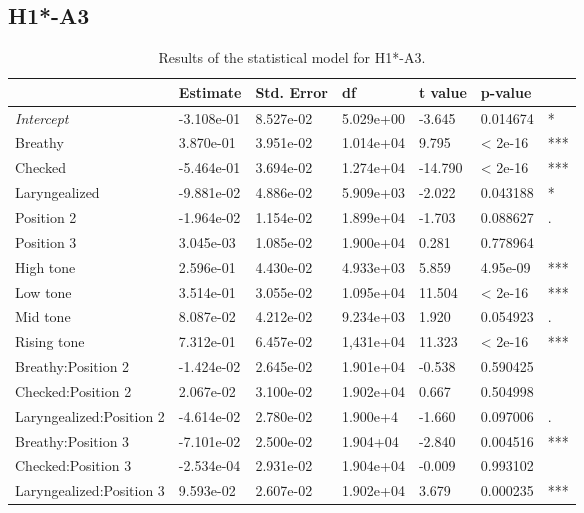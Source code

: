\documentclass[12pt, letterpaper]{article}
\providecommand{\lsptoprule}{\midrule\toprule}
\providecommand{\lspbottomrule}{\bottomrule\midrule}
\begin{document}
\subsection{H1*-A3} \label{sec:H1A3}

\begin{table}[!h]
  \centering
  \caption{Results of the statistical model for H1*-A3.}
  \label{tab:H1A3Results}
  \begin{tabular}{lllllll}
    \lsptoprule
     & Estimate & Std. Error & df & t value & p-value & \\ \hline
    \textit{Intercept} & -3.108e-01 & 8.527e-02 & 5.029e+00 & -3.645 & 0.014674 & * \\
    Breathy & 3.870e-01 & 3.951e-02 & 1.014e+04 & 9.795 & < 2e-16 & *** \\
    Checked & -5.464e-01 & 3.694e-02 & 1.274e+04 & -14.790 & < 2e-16 & *** \\
    Laryngealized & -9.881e-02 & 4.886e-02 & 5.909e+03 & -2.022 & 0.043188 & *  \\
    Position 2 & -1.964e-02 & 1.154e-02 & 1.899e+04 & -1.703 & 0.088627 & . \\
    Position 3 & 3.045e-03 & 1.085e-02 & 1.900e+04 & 0.281 & 0.778964 & \\
    High tone & 2.596e-01 & 4.430e-02 & 4.933e+03 & 5.859 & 4.95e-09 & ***  \\
    Low tone & 3.514e-01 & 3.055e-02 & 1.095e+04 & 11.504 & < 2e-16 & *** \\
    Mid tone & 8.087e-02 & 4.212e-02 & 9.234e+03 & 1.920 & 0.054923 & . \\
    Rising tone & 7.312e-01 & 6.457e-02 & 1,431e+04 & 11.323 & < 2e-16 & *** \\
    Breathy:Position 2 & -1.424e-02 & 2.645e-02 & 1.901e+04 & -0.538 & 0.590425 & \\
    Checked:Position 2 & 2.067e-02 & 3.100e-02 & 1.902e+04 & 0.667 & 0.504998 & \\
    Laryngealized:Position 2 & -4.614e-02 & 2.780e-02 & 1.900e+4 & -1.660 & 0.097006 & . \\
    Breathy:Position 3 & -7.101e-02 & 2.500e-02 & 1.904+04 & -2.840 & 0.004516 & *** \\
    Checked:Position 3 & -2.534e-04 & 2.931e-02 & 1.904e+04 & -0.009 & 0.993102 & \\
    Laryngealized:Position 3 & 9.593e-02 & 2.607e-02 & 1.902e+04 & 3.679 & 0.000235 & *** \\
    \lspbottomrule
  \end{tabular}
\end{table}
\end{document}
